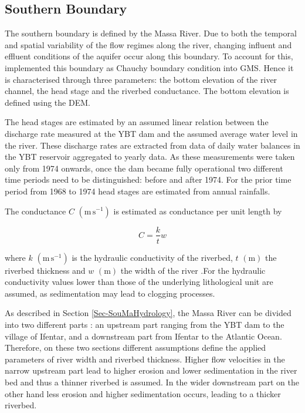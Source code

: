 \subsection{Southern Boundary}

The southern boundary is defined by the Massa River. Due to both the temporal and spatial variability of the flow regimes along the river, changing influent and effluent conditions of the aquifer occur along this boundary. To account for this, \cite{Horn.2021} implemented this boundary as Chauchy boundary condition into GMS. Hence it is characterised through three parameters: the bottom elevation of the river channel, the head stage and the riverbed conductance. The bottom elevation is defined using the DEM.

The head stages are estimated by an assumed linear relation between the discharge rate measured at the YBT dam and the assumed average water level in the river. These discharge rates are extracted from data of daily water balances in the YBT reservoir aggregated to yearly data. As these measurements were taken only from 1974 onwards, once the dam became fully operational two different time periods need to be distinguished: before and after 1974. For the prior time period from 1968 to 1974 head stages are estimated from annual rainfalls.

The conductance $C$ $\left( \textrm{m} \, \textrm{s}^{-1} \right)$ is estimated as conductance per unit length by

\begin{equation}
    C = \frac{k}{t} w
\end{equation}

where $k$ $\left( \textrm{m} \, \textrm{s}^{-1} \right)$ is the hydraulic conductivity of the riverbed, $t$ $\left( \textrm{m} \right)$ the riverbed thickness and $w$ $\left( \textrm{m}\right)$ the width of the river \parencite{Aquaveo.2019}.For the hydraulic conductivity values lower than those of the underlying lithological unit are assumed, as sedimentation may lead to clogging processes.

As described in Section \ref{Sec-SouMaHydrology}, the Massa River can be divided into two different parts \parencite{Horn.2021}: an upstream part ranging from the YBT dam to the village of Ifentar, and a downstream part from Ifentar to the Atlantic Ocean. Therefore, on these two sections different assumptions define the applied parameters of river width and riverbed thickness. Higher flow velocities in the narrow upstream part lead to higher erosion and lower sedimentation in the river bed and thus a thinner riverbed is assumed. In the wider downstream part on the other hand less erosion and higher sedimentation occurs, leading to a thicker riverbed.

